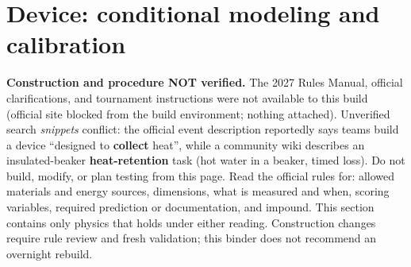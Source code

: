 \section{Device: conditional modeling and calibration}\label{sec:device}
\begin{rulebox}\textbf{Construction and procedure NOT verified.} The 2027 Rules Manual, official clarifications, and tournament instructions were not available to this build (official site blocked from the build environment; nothing attached). Unverified search \emph{snippets} conflict: the official event description reportedly says teams build a device ``designed to \textbf{collect} heat'', while a community wiki describes an insulated-beaker \textbf{heat-retention} task (hot water in a beaker, timed loss). Do not build, modify, or plan testing from this page. Read the official rules for: allowed materials and energy sources, dimensions, what is measured and when, scoring variables, required prediction or documentation, and impound. This section contains only physics that holds under either reading. Construction changes require rule review and fresh validation; this binder does not recommend an overnight rebuild.\end{rulebox}

